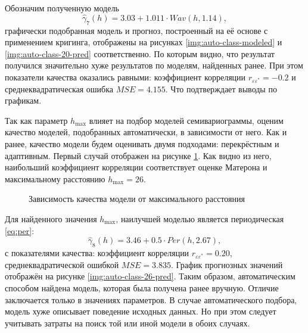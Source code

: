 Обозначим полученную модель
\begin{equation}
\label{eq:gamma7}
	\widehat{\gamma}_7(h) = 3.03 + 1.011 \cdot Wav(h, 1.14),
\end{equation}
графически подобранная модель и прогноз, построенный на её основе с применением кригинга, отображены на рисунках \ref{img:auto-class-modeled} и \ref{img:auto-class-20-pred} соответственно. По которым видно, что результат получился значительно хуже результатов по моделям, найденных ранее. При этом показатели качества оказались равными: коэффициент корреляции $ r_{\varepsilon\varepsilon^{*}} = -0.2 $ и среднеквадратическая ошибка $ MSE = 4.155 $. Что подтверждает выводы по графикам.

Так как параметр $ h_{\text{max}} $ влияет на подбор моделей семивариограммы, оценим качество моделей, подобранных автоматически, в зависимости от него. Как и ранее, качество модели будем оценивать двумя подходами: перекрёстным и адаптивным. Первый случай отображен на рисунке \ref{img:auto-corr-cutoff}. Как видно из него, наибольший коэффициент корреляции соответствует оценке Матерона и максимальному расстоянию $ h_{\text{max}} = 26 $.
\begin{figure}[ht]
\caption{Зависимость качества модели от максимального расстояния}
\label{img:auto-corr-cutoff}
\end{figure}
Для найденного значения $ h_{\text{max}} $, наилучшей моделью является периодическая \eqref{eq:per}:
\begin{equation*}
 	\widehat{\gamma}_8(h) = 3.46 + 0.5 \cdot Per(h, 2.67),
\end{equation*}
с показателями качества: коэффициент корреляции $ r_{\varepsilon\varepsilon^{*}} = 0.20 $, среднеквадратической ошибкой $ MSE = 3.835 $. График прогнозных значений отображён на рисунке \ref{img:auto-class-26-pred}. Таким образом, автоматическим способом найдена модель, которая была получена ранее вручную. Отличие заключается только в значениях параметров. В случае автоматического подбора, модель хуже описывает поведение исходных данных. Но при этом следует учитывать затраты на поиск той или иной модели в обоих случаях.


